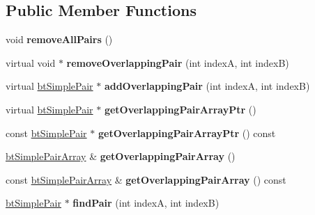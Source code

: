 \subsection*{Public Member Functions}
\begin{DoxyCompactItemize}
\item 
\mbox{\label{classbtHashedSimplePairCache_aff97f2604b1c3b0ffa2bc73458efb361}} 
void {\bfseries remove\+All\+Pairs} ()
\item 
\mbox{\label{classbtHashedSimplePairCache_afb66e5568574b8a2abf6010c85825ada}} 
virtual void $\ast$ {\bfseries remove\+Overlapping\+Pair} (int indexA, int indexB)
\item 
\mbox{\label{classbtHashedSimplePairCache_ae86e64195cae4126ee4089e45633e3ae}} 
virtual \hyperlink{structbtSimplePair}{bt\+Simple\+Pair} $\ast$ {\bfseries add\+Overlapping\+Pair} (int indexA, int indexB)
\item 
\mbox{\label{classbtHashedSimplePairCache_ab88a7dd4f4f640b357a454073e833902}} 
virtual \hyperlink{structbtSimplePair}{bt\+Simple\+Pair} $\ast$ {\bfseries get\+Overlapping\+Pair\+Array\+Ptr} ()
\item 
\mbox{\label{classbtHashedSimplePairCache_afc82c3fa21d235cf6ea8f39957c96810}} 
const \hyperlink{structbtSimplePair}{bt\+Simple\+Pair} $\ast$ {\bfseries get\+Overlapping\+Pair\+Array\+Ptr} () const
\item 
\mbox{\label{classbtHashedSimplePairCache_ac0875ac64391ff59021a10ea0e6181c7}} 
\hyperlink{classbtAlignedObjectArray}{bt\+Simple\+Pair\+Array} \& {\bfseries get\+Overlapping\+Pair\+Array} ()
\item 
\mbox{\label{classbtHashedSimplePairCache_a0eebe3b875d59b98f7e32fa9f1b76912}} 
const \hyperlink{classbtAlignedObjectArray}{bt\+Simple\+Pair\+Array} \& {\bfseries get\+Overlapping\+Pair\+Array} () const
\item 
\mbox{\label{classbtHashedSimplePairCache_ad65d327383a0114f03a7d585119c9f59}} 
\hyperlink{structbtSimplePair}{bt\+Simple\+Pair} $\ast$ {\bfseries find\+Pair} (int indexA, int indexB)

\end{DoxyCompactItemize}
